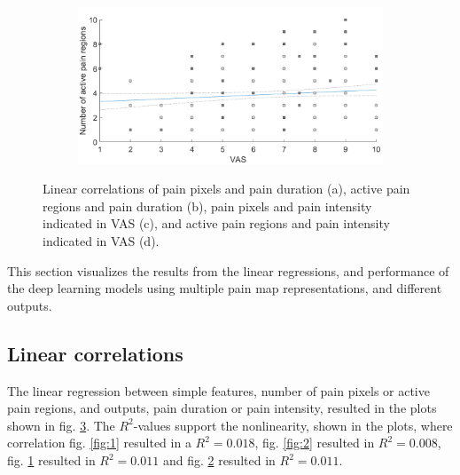 \begin{figure} [b!]
\begin{tcolorbox}[colframe=black!30!black, colback=white]
\begin{subfigure}[b]{0.51\textwidth}
    \caption{}
    \label{fig:3}
  \end{subfigure}
  \hfill
  \hspace{2mm}
  \begin{subfigure}[b]{0.51\textwidth}
    \includegraphics[width=\textwidth]{Figures/vasregion}
       \caption{ }
    \label{fig:4}
  \end{subfigure}  
  \caption{Linear correlations of pain pixels and pain duration (a), active pain regions and pain duration (b), pain pixels and pain intensity indicated in VAS (c), and active pain regions and pain intensity indicated in VAS (d).}
  \label{fig:correlations}
\end{tcolorbox}
\end{figure}

This section visualizes the results from the linear regressions, and performance of the deep learning models using multiple pain map representations, and different outputs. 
\vspace{-0.3cm}

\subsection*{Linear correlations}
The linear regression between simple features, number of pain pixels or active pain regions, and outputs, pain duration or pain intensity, resulted in the plots shown in fig. \ref{fig:correlations}. The $R^2$-values support the nonlinearity, shown in the plots, where correlation fig. \ref{fig:1} resulted in a $R^2 = 0.018$, fig. \ref{fig:2} resulted in $R^2 = 0.008$, fig. \ref{fig:3} resulted in $R^2 = 0.011$ and fig. \ref{fig:4} resulted in $R^2 = 0.011$. 


